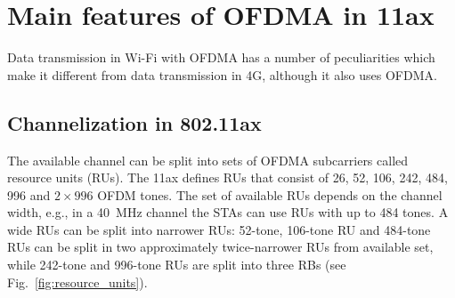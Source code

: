 \begin{table}[b]
	{\centering
		\caption{\label{table:RUdatarate} Data rate of different RU types at each MCS in Mbps}
	}
\end{table}

\clearpage

\section{Main features of OFDMA in 11ax}
Data transmission in Wi-Fi with OFDMA has a number of peculiarities which make it different from data transmission in 4G, although it also uses OFDMA.

\subsection{Channelization in 802.11ax}
The available channel can be split into sets of OFDMA subcarriers called resource units (RUs).
The 11ax defines RUs that consist of 26, 52, 106, 242, 484, 996 and $2\times996$ OFDM tones.
The set of available RUs depends on the channel width, e.g., in a \SI{40}{\MHz} channel the STAs can use RUs with up to 484 tones.
A wide RUs can be split into narrower RUs: 52-tone, 106-tone RU and 484-tone RUs can be split in two approximately twice-narrower RUs from available set, while 242-tone and 996-tone RUs are split into three RBs (see Fig.~\ref{fig:resource_units}). 


